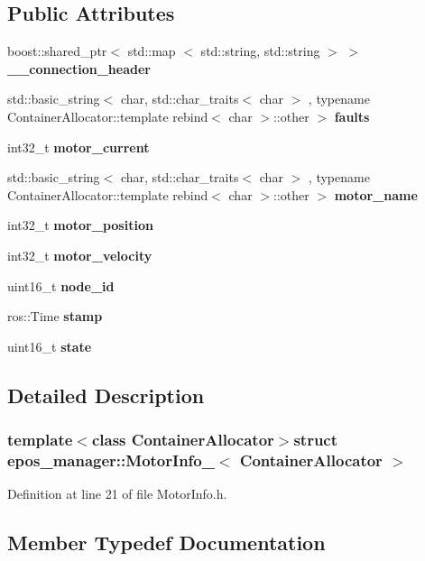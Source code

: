 \subsection*{\-Public \-Attributes}
\begin{DoxyCompactItemize}
\item 
boost\-::shared\-\_\-ptr$<$ std\-::map\*
$<$ std\-::string, std\-::string $>$ $>$ {\bf \-\_\-\-\_\-connection\-\_\-header}
\item 
std\-::basic\-\_\-string$<$ char, \*
std\-::char\-\_\-traits$<$ char $>$\*
, typename \*
\-Container\-Allocator\-::template \*
rebind$<$ char $>$\-::other $>$ {\bf faults}
\item 
int32\-\_\-t {\bf motor\-\_\-current}
\item 
std\-::basic\-\_\-string$<$ char, \*
std\-::char\-\_\-traits$<$ char $>$\*
, typename \*
\-Container\-Allocator\-::template \*
rebind$<$ char $>$\-::other $>$ {\bf motor\-\_\-name}
\item 
int32\-\_\-t {\bf motor\-\_\-position}
\item 
int32\-\_\-t {\bf motor\-\_\-velocity}
\item 
uint16\-\_\-t {\bf node\-\_\-id}
\item 
ros\-::\-Time {\bf stamp}
\item 
uint16\-\_\-t {\bf state}
\end{DoxyCompactItemize}


\subsection{\-Detailed \-Description}
\subsubsection*{template$<$class Container\-Allocator$>$struct epos\-\_\-manager\-::\-Motor\-Info\-\_\-$<$ Container\-Allocator $>$}



\-Definition at line 21 of file \-Motor\-Info.\-h.



\subsection{\-Member \-Typedef \-Documentation}
